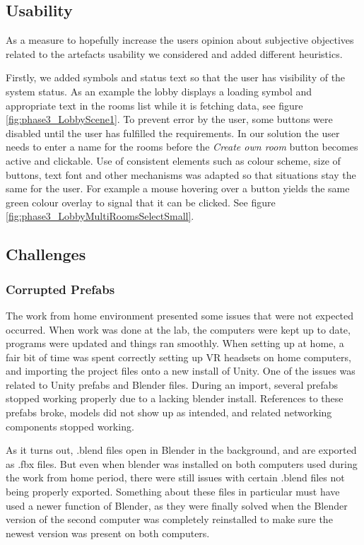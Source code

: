 \subsection{Usability}
As a measure to hopefully increase the users opinion about subjective objectives related to the artefacts usability we considered and added different heuristics. 

Firstly, we added symbols and status text so that the user has visibility of the system status. As an example the lobby displays a loading symbol and appropriate text in the rooms list while it is fetching data, see figure \ref{fig:phase3_LobbyScene1}.  
To prevent error by the user, some buttons were disabled until the user has fulfilled the requirements. In our solution the user needs to enter a name for the rooms before the \textit{Create own room} button becomes active and clickable.
Use of consistent elements such as colour scheme, size of buttons, text font and other mechanisms was adapted so that situations stay the same for the user. For example a mouse hovering over a button yields the same green colour overlay to signal that it can be clicked. See figure \ref{fig:phase3_LobbyMultiRoomsSelectSmall}. 



\subsection{Challenges}

\subsubsection{Corrupted Prefabs}
The work from home environment presented some issues that were not expected occurred. When work was done at the lab, the computers were kept up to date, programs were updated and things ran smoothly. When setting up at home, a fair bit of time was spent correctly setting up VR headsets on home computers, and importing the project files onto a new install of Unity. One of the issues was related to Unity prefabs and Blender files. During an import, several prefabs stopped working properly due to a lacking blender install. References to these prefabs broke, models did not show up as intended, and related networking components stopped working. 

As it turns out, .blend files open in Blender in the background, and are exported as .fbx files. But even when blender was installed on both computers used during the work from home period, there were still issues with certain .blend files not being properly exported. Something about these files in particular must have used a newer function of Blender, as they were finally solved when the Blender version of the second computer was completely reinstalled to make sure the newest version was present on both computers. 



